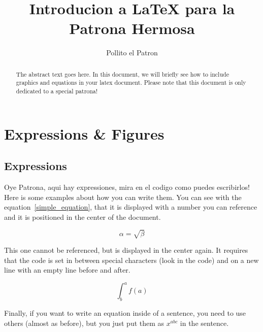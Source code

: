 \documentclass{article}    %
\begin{document}

\title{Introducion a \LaTeX{} para la Patrona Hermosa}
\author{Pollito el Patron}
 
\maketitle  %

\begin{abstract} %
The abstract text goes here.
In this document, we will briefly see how to include graphics and equations in your latex document.
Please note that this document is only dedicated to a special patrona!
\end{abstract}

\section{Expressions \& Figures}

\subsection{Expressions}
Oye Patrona, aqui hay expressiones, mira en el codigo como puedes escribirlos!
Here is some examples about how you can write them.
You can see with the equation~\ref{simple_equation}, that it is displayed with a number you can reference and it is positioned in the center of the document.

\begin{equation}
    \label{simple_equation}  %
    \alpha = \sqrt{ \beta }
\end{equation}

This one cannot be referenced, but is displayed in the center again. 
It requires that the code is set in between special characters (look in the code) and on a new line with an empty line before and after.

\[\int ^{a}_{b}f\left( a\right)\]

Finally, if you want to write an equation inside of a sentence, you need to use others (almost as before), but you just put them as \(x^{a b c}\) in the sentence.
\end{document}
